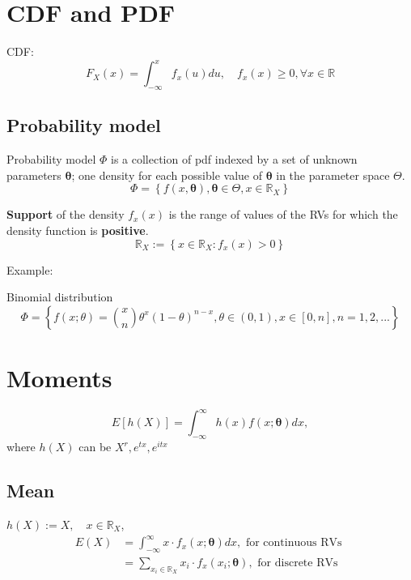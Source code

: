 \documentclass[12pt]{article}
\title{}
\author{}
\date{}
\begin{document}
\section{CDF and PDF}
CDF:
\begin{equation*}
F_{X}(x) = \int_{ - \infty }^{x}f_{x}(u)du, \quad f_{x}(x) \ge 0, \forall x \in \mathbb{R} 
\end{equation*}


\subsection{Probability model}
Probability model $ \Phi $ is a collection of pdf indexed by a set of unknown parameters
$ \bm{\theta} $; one density for each possible value of $ \bm{\theta} $ in the parameter
space $ \Theta $.
\begin{equation*}
\Phi = \left\{ f(x,\bm{\theta}), \bm{\theta}\in \Theta, x \in \mathbb{R}_{X} \right\} 
\end{equation*}

{\textbf {Support}} of the density $ f_{x}(x) $ is the range of values of the RVs for which the
density function is {\textbf {positive}}.
\begin{equation*}
\mathbb{R}_{X}:=\left\{ x \in \mathbb{R}_{X}: f_{x}(x) > 0 \right\} 
\end{equation*}

Example:

Binomial distribution
\begin{equation*}
\Phi = \left\{ f(x;\theta) = \binom{x}{n}\theta^{x}(1 - \theta)^{n - x},
\theta \in (0,1), x \in [0,n], n = 1,2,...\right\} 
\end{equation*}


\section{Moments}
\begin{equation*}
	E[h(X)] = \int_{ - \infty }^{\infty }h(x)f(x;\bm{\theta})dx, 
\end{equation*}
where $ h(X) $ can be $ X^{r}, e^{tx}, e^{itx} $


\subsection{Mean}
$ h(X):= X , \quad x \in \mathbb{R}_{X}$, 
\begin{align*}
	E(X) &= \int_{ - \infty }^{\infty } x \cdot f_{x}(x;\bm{\theta})dx, \text{ for continuous RVs }\\
	&= \sum\limits_{x_{i}\in \mathbb{R}_{X}} x_{i}\cdot f_{x}(x_{i};\bm{\theta}), \text{ for 
	discrete RVs}
\end{align*}
\end{document}
